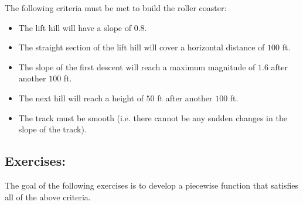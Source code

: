 \noindent
The following criteria must be met to build the roller coaster:
\begin{itemize}
	\item The lift hill will have a slope of $0.8$.
	\item The straight section of the lift hill will cover a horizontal distance of $100$ ft.
	\item The slope of the first descent will reach a maximum magnitude of $1.6$ after another $100$ ft.
	\item The next hill will reach a height of $50$ ft after another $100$ ft.
	\item The track must be smooth (i.e. there cannot be any sudden changes in the slope of the track).
\end{itemize}

\clearpage

\subsection*{Exercises:}
The goal of the following exercises is to develop a piecewise function that satisfies all of the above criteria.

